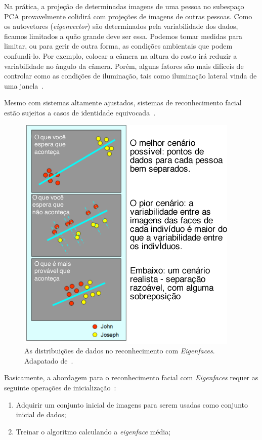 	Na prática, a projeção de determinadas imagens de uma pessoa no subespaço PCA
	provavelmente colidirá com projeções de imagens de outras pessoas. Como os
	autovetores (\textit{eigenvector}) são determinados pela variabilidade dos
	dados, ficamos limitados a quão grande deve ser essa. Podemos tomar medidas para
	limitar, ou para gerir de outra forma, as condições ambientais que podem
	confundi-lo. Por exemplo, colocar a câmera na altura do rosto irá reduzir a
	variabilidade no ângulo da câmera. Porém, alguns fatores são mais difíceis de
	controlar como as condições de iluminação, tais como iluminação lateral vinda de
	uma janela~\cite{hewitt}.
	
	Mesmo com sistemas altamente ajustados, sistemas de reconhecimento facial estão
	sujeitos a casos de identidade equivocada~\cite{hewitt}.

	\begin{figure}[H]
		\begin{center}
			\includegraphics[scale=6.0]{figuras/2.FundamentacaoTeorica/espacoPCA.png}
		\end{center}
		\caption{As distribuições de dados no reconhecimento com \textit{Eigenfaces}. Adapatado de~\cite{hewitt}.}
		\label{exemploEspacoPCA}
	\end{figure}

	Basicamente, a abordagem para o reconhecimento facial com \textit{Eigenfaces} requer as
	seguinte operações de inicialização~\cite{turk}:

	\begin{enumerate}
		\item Adquirir um conjunto inicial de imagens para serem usadas como conjunto inicial de dados;
		\item Treinar o algoritmo calculando a \textit{eigenface} média;
	\end{enumerate}

